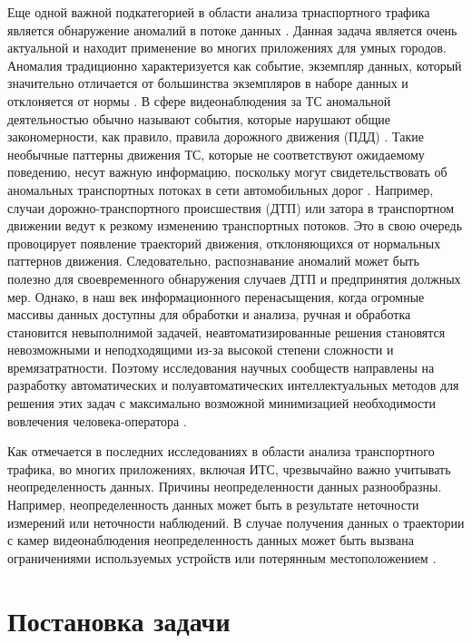 Еще одной важной подкатегорией в области анализа трнаспортного трафика является обнаружение аномалий в потоке данных \cite{article:9_trb_vc_aev_sc}. Данная задача является очень актуальной и находит применение во многих приложениях для умных городов. Аномалия традиционно характеризуется как событие, экземпляр данных, который значительно отличается от большинства экземпляров в наборе данных и отклоняется от нормы \cite{article:1_survey_stdm}. В сфере видеонаблюдения за ТС аномальной деятельностью обычно называют события, которые нарушают общие закономерности, как правило, правила дорожного движения (ПДД) \cite{inproceedings:21_ad_dbscan_tvs}. Такие необычные паттерны движения ТС, которые не соответствуют ожидаемому поведению, несут важную информацию, поскольку могут свидетельствовать об аномальных транспортных потоках в сети автомобильных дорог \cite{article:9_trb_vc_aev_sc}. Например, случаи дорожно-транспортного происшествия (ДТП) или затора в транспортном движении ведут к резкому изменению транспортных потоков. Это в свою очередь провоцирует появление траекторий движения, отклоняющихся от нормальных паттернов движения. Следовательно, распознавание аномалий может быть полезно для своевременного обнаружения случаев ДТП и предпринятия должных мер. Однако, в наш век информационного перенасыщения, когда огромные массивы данных доступны для обработки и анализа, ручная и обработка становится невыполнимой задачей, неавтоматизированные решения становятся невозможными и неподходящими из-за высокой степени сложности и времязатратности. Поэтому исследования научных сообществ направлены на разработку автоматических и полуавтоматических интеллектуальных методов для решения этих задач с максимально возможной минимизацией необходимости вовлечения человека-оператора \cite{article:19_gbta_ubd_is}.

Как отмечается в последних исследованиях в области анализа транспортного трафика, во многих приложениях, включая ИТС, чрезвычайно важно учитывать неопределенность данных. Причины неопределенности данных разнообразны. Например, неопределенность данных может быть в результате неточности измерений или неточности наблюдений. В случае получения данных о траектории с камер видеонаблюдения неопределенность данных может быть вызвана ограничениями используемых устройств или потерянным местоположением \cite{inproceedings:14_mpfstsp_gp_ud}.

\section{Постановка задачи}


